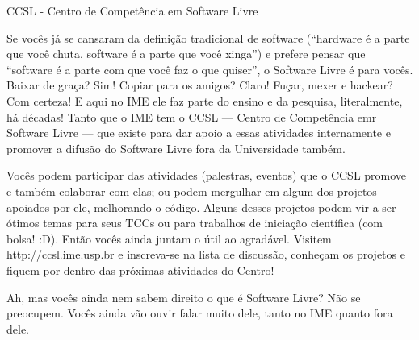 \begin{secao}{CCSL - Centro de Competência em Software Livre}

Se vocês já se cansaram da definição tradicional de software (``hardware é a
parte que você chuta, software é a parte que você xinga'') e prefere pensar que
``software é a parte com que você faz o que quiser'', o Software Livre é para
vocês. Baixar de graça? Sim! Copiar para os amigos? Claro! Fuçar, mexer e
hackear? Com certeza! E aqui no IME ele faz parte do ensino e da pesquisa,
literalmente, há décadas! Tanto que o IME tem o CCSL — Centro de Competência emr
Software Livre — que existe para dar apoio a essas atividades internamente e
promover a difusão do Software Livre fora da Universidade também.

Vocês podem participar das atividades (palestras, eventos) que o CCSL
promove e também colaborar com elas; ou podem mergulhar em algum dos
projetos apoiados por ele, melhorando o código. Alguns desses projetos
podem vir a ser ótimos temas para seus TCCs ou para trabalhos de
iniciação científica (com bolsa! :D). Então vocês ainda juntam o útil ao
agradável. Visitem http://ccsl.ime.usp.br e inscreva-se na lista de discussão,
conheçam os projetos e fiquem por dentro das próximas atividades do
Centro!

Ah, mas vocês ainda nem sabem direito o que é Software Livre? Não se preocupem.
Vocês ainda vão ouvir falar muito dele, tanto no IME quanto fora dele. %

\end{secao}
